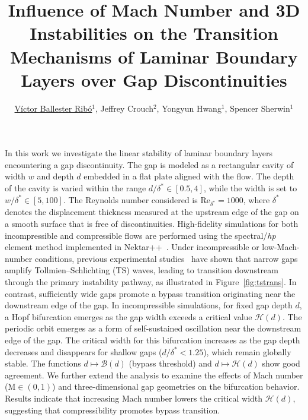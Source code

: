 \documentclass[a4paper,10pt]{article}
\begin{document}
%
%

\title{Influence of Mach Number and 3D Instabilities on the Transition Mechanisms of Laminar Boundary Layers over Gap Discontinuities}

\author{\underline{Víctor Ballester Ribó}$^1$, Jeffrey Crouch$^2$, Yongyun Hwang$^1$, Spencer Sherwin$^1$}

\maketitle

In this work we investigate the linear stability of laminar boundary layers encountering a gap discontinuity. The gap is modeled as a rectangular cavity of width $w$ and depth $d$ embedded in a flat plate aligned with the flow. The depth of the cavity is varied within the range $d/\delta^* \in [0.5, 4]$, while the width is set to $w/\delta^* \in [5, 100]$. The Reynolds number considered is $\textrm{Re}_{\delta^*} = 1000$, where $\delta^*$ denotes the displacement thickness measured at the upstream edge of the gap on a smooth surface that is free of discontinuities. High-fidelity simulations for both incompressible and compressible flows are performed using the spectral/\emph{hp} element method implemented in Nektar++~\cite{nektarpp}. Under incompressible or low-Mach-number conditions, previous experimental studies~\cite{jeffGaps} have shown that narrow gaps amplify Tollmien--Schlichting (TS) waves, leading to transition downstream through the primary instability pathway, as illustrated in Figure~\ref{fig:tstrans}. In contrast, sufficiently wide gaps promote a bypass transition originating near the downstream edge of the gap. In incompressible simulations, for fixed gap depth $d$, a Hopf bifurcation emerges as the gap width exceeds a critical value $\mathcal{H}(d)$. The periodic orbit emerges as a form of self-sustained oscillation near the downstream edge of the gap. The critical width for this bifurcation increases as the gap depth decreases and disappears for shallow gaps ($d/\delta^* < 1.25$), which remain globally stable. The functions $d\mapsto \mathcal{B}(d)$ (bypass threshold) and $d\mapsto \mathcal{H}(d)$ show good agreement. We further extend the analysis to examine the effects of Mach number ($\textrm{M} \in (0,1)$) and three-dimensional gap geometries on the bifurcation behavior. Results indicate that increasing Mach number lowers the critical width $\mathcal{H}(d)$, suggesting that compressibility promotes bypass transition.
\end{document}
